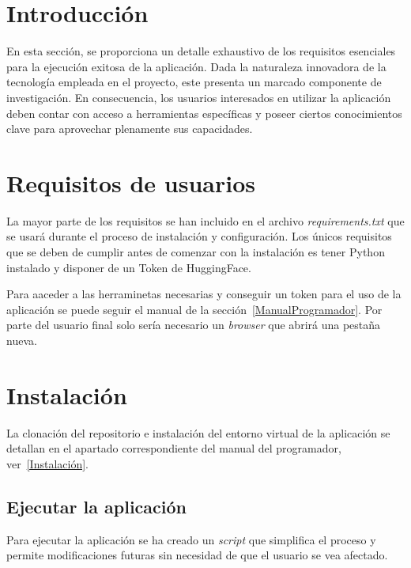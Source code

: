 
\section{Introducción}

En esta sección, se proporciona un detalle exhaustivo de los requisitos esenciales para la ejecución exitosa de la aplicación. Dada la naturaleza innovadora de la tecnología empleada en el proyecto, este presenta un marcado componente de investigación. En consecuencia, los usuarios interesados en utilizar la aplicación deben contar con acceso a herramientas específicas y poseer ciertos conocimientos clave para aprovechar plenamente sus capacidades.

\section{Requisitos de usuarios}

La mayor parte de los requisitos se han incluido en el archivo \textit{requirements.txt} que se usará durante el proceso de instalación y configuración. Los únicos requisitos que se deben de cumplir antes de comenzar con la instalación es tener Python instalado y disponer de un Token de HuggingFace.

Para aaceder a las herraminetas necesarias y conseguir un token para el uso de la aplicación se puede seguir el manual de la sección~\ref{ManualProgramador}. Por parte del usuario final solo sería necesario un \textit{browser} que abrirá una pestaña nueva.

\section{Instalación}

La clonación del repositorio e instalación del entorno virtual de la aplicación se detallan en el apartado correspondiente del manual del programador, ver~\ref{Instalación}.

\subsection{Ejecutar la aplicación}

Para ejecutar la aplicación se ha creado un \textit{script} que simplifica el proceso y permite modificaciones futuras sin necesidad de que el usuario se vea afectado.

